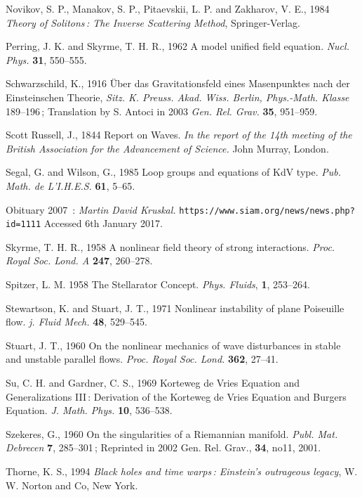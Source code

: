 \documentclass[11pt]{article}
\begin{document}
\begin{thebibliography}{30}
 Novikov, S. P., Manakov, S. P., Pitaevskii, L. P.  and Zakharov, V. E., 1984 \textit{Theory of Solitons\,: The Inverse Scattering Method}, Springer-Verlag. 

 Perring, J. K. and Skyrme, T. H. R., 1962 A model unified field equation. \textit{Nucl. Phys.} \textbf{31}, 
550--555.

 Schwarzschild, K., 1916  \"Uber das Gravitationsfeld eines Masenpunktes nach der Einsteinschen Theorie,  
\textit{Sitz. K. Preuss. Akad. Wiss. Berlin, Phys.-Math. Klasse} 189--196\,;  Translation by S. Antoci in 2003 
\textit{Gen. Rel. Grav.} \textbf{35}, 951--959.

 Scott Russell, J., 1844 Report on Waves. \textit{In the report of the 14th meeting of the British 
Association for the Advancement of Science.} John Murray, London.

 Segal, G. and Wilson, G., 1985 Loop groups and equations of KdV type. \textit{Pub. Math. de L'I.H.E.S.} 
\textbf{61}, 5--65.

 Obituary 2007 \,: \textit{Martin David Kruskal.} 
\verb+https://www.siam.org/news/news.php?id=1111+ Accessed 6th January 2017.

 Skyrme, T. H. R., 1958 A nonlinear field theory of strong interactions. \textit{Proc. Royal Soc. 
Lond. A} \textbf{247}, 260--278.

 Spitzer, L. M. 1958 The Stellarator Concept. \textit{Phys. Fluids}, \textbf{1}, 253--264.

 Stewartson, K. and Stuart, J. T., 1971 Nonlinear instability of plane Poiseuille flow. \textit{j. Fluid Mech.} 
\textbf{48}, 529--545.

 Stuart, J. T., 1960 On the nonlinear mechanics of wave disturbances in stable and unstable parallel flows. 
\textit{Proc. Royal Soc. Lond.} \textbf{362}, 27--41. 

 Su, C. H. and Gardner, C. S., 1969 Korteweg de Vries Equation and Generalizations III\,: Derivation of the Korteweg 
de Vries Equation and Burgers Equation. \textit{J. Math. Phys.} \textbf{10}, 536--538.

 Szekeres, G., 1960 On the singularities of a Riemannian manifold. \textit{Publ. Mat. Debrecen} \textbf{7}, 
285--301\,; Reprinted in 2002 Gen. Rel. Grav., \textbf{34}, no11, 2001.

 Thorne, K. S., 1994 \textit{Black holes and time warps\,: Einstein's outrageous legacy}, W. W. Norton 
and Co, New York. 


\end{thebibliography}
\end{document}
